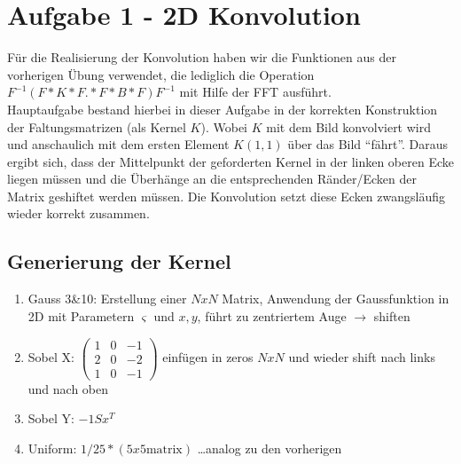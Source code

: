 



\newcommand{\nr}{2}
\lstset{language=matlab}


\section*{Aufgabe 1 - 2D Konvolution}
F\"ur die Realisierung der Konvolution haben wir die Funktionen aus der
vorherigen \"Ubung verwendet, die lediglich die Operation 
$F^{-1}(F*K*F .* F*B*F)F^{-1}$ mit Hilfe der FFT ausf\"uhrt.
\\
Hauptaufgabe bestand hierbei in dieser Aufgabe in der korrekten  Konstruktion 
der Faltungsmatrizen (als Kernel $K$). Wobei $K$ mit dem Bild konvolviert wird und
anschaulich mit dem ersten Element $K(1,1)$ \"uber das Bild ``f\"ahrt''. Daraus
ergibt sich, dass der Mittelpunkt der geforderten Kernel in der linken oberen Ecke
liegen m\"ussen und die \"Uberh\"ange an die entsprechenden R\"ander/Ecken der Matrix
geshiftet werden m\"ussen. Die Konvolution setzt diese Ecken zwangsl\"aufig wieder
korrekt zusammen.

\subsection*{Generierung der Kernel}
\begin{enumerate}
\item Gauss 3\&10: Erstellung einer $NxN$ Matrix, Anwendung der Gaussfunktion 
      in 2D mit Parametern $\varsigma$ und $x, y$, f\"uhrt zu zentriertem Auge $ \to $ shiften
\item Sobel X: $ \begin{pmatrix} 1 & 0 & -1 \\ 2 & 0 & -2 \\ 1 & 0 & -1  \end{pmatrix}$ einf\"ugen
in zeros $NxN$ und wieder shift nach links und nach oben
\item Sobel Y: $-1 Sx^{T}$
\item Uniform: $1/25*(5x5\text{matrix})$ \ldots analog zu den vorherigen
\end{enumerate}

